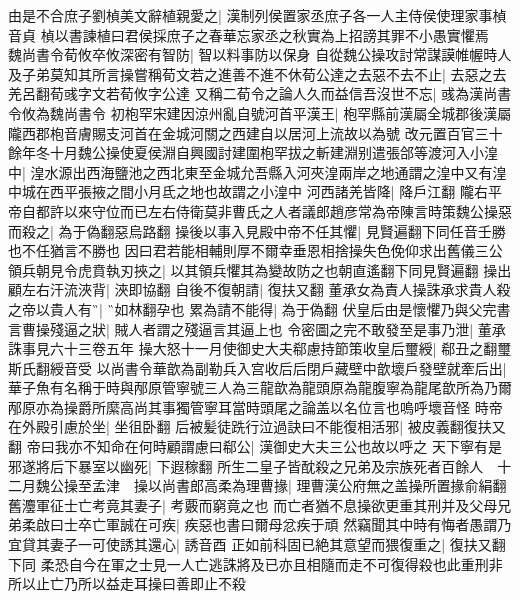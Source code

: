 由是不合庶子劉楨美文辭植親愛之|{
	漢制列侯置家丞庶子各一人主侍侯使理家事楨音貞}
楨以書諫植曰君侯採庶子之春華忘家丞之秋實為上招謗其罪不小愚實懼焉　魏尚書令荀攸卒攸深密有智防|{
	智以料事防以保身}
自從魏公操攻討常謀謨帷幄時人及子弟莫知其所言操嘗稱荀文若之進善不進不休荀公達之去惡不去不止|{
	去惡之去羌呂翻荀彧字文若荀攸字公達}
又稱二荀令之論人久而益信吾沒世不忘|{
	彧為漢尚書令攸為魏尚書令}
初枹罕宋建因涼州亂自號河首平漢王|{
	枹罕縣前漢屬全城郡後漢屬隴西郡枹音膚賜支河首在金城河關之西建自以居河上流故以為號}
改元置百官三十餘年冬十月魏公操使夏侯淵自興國討建圍枹罕拔之斬建淵别遣張郃等渡河入小湟中|{
	湟水源出西海鹽池之西北東至金城允吾縣入河夾湟兩岸之地通謂之湟中又有湟中城在西平張掖之間小月氐之地也故謂之小湟中}
河西諸羌皆降|{
	降戶江翻}
隴右平　帝自都許以來守位而已左右侍衛莫非曹氏之人者議郎趙彦常為帝陳言時策魏公操惡而殺之|{
	為于偽翻惡烏路翻}
操後以事入見殿中帝不任其懼|{
	見賢遍翻下同任音壬勝也不任猶言不勝也}
因曰君若能相輔則厚不爾幸垂恩相捨操失色俛仰求出舊儀三公領兵朝見令虎賁執刃挾之|{
	以其領兵懼其為變故防之也朝直遙翻下同見賢遍翻}
操出顧左右汗流浹背|{
	浹即協翻}
自後不復朝請|{
	復扶又翻}
董承女為責人操誅承求貴人殺之帝以貴人有|{
	如林翻孕也}
累為請不能得|{
	為于偽翻}
伏皇后由是懷懼乃與父完書言曹操殘逼之狀|{
	賊人者謂之殘逼言其逼上也}
令密圖之完不敢發至是事乃泄|{
	董承誅事見六十三卷五年}
操大怒十一月使御史大夫郗慮持節策收皇后璽綬|{
	郗丑之翻璽斯氏翻綬音受}
以尚書令華歆為副勒兵入宫收后后閉戶藏壁中歆壞戶發壁就牽后出|{
	華子魚有名稱于時與邴原管寧號三人為三龍歆為龍頭原為龍腹寧為龍尾歆所為乃爾邴原亦為操爵所縻高尚其事獨管寧耳當時頭尾之論盖以名位言也嗚呼壞音怪}
時帝在外殿引慮於坐|{
	坐徂卧翻}
后被髪徒跣行泣過訣曰不能復相活邪|{
	被皮義翻復扶又翻}
帝曰我亦不知命在何時顧謂慮曰郗公|{
	漢御史大夫三公也故以呼之}
天下寧有是邪遂將后下暴室以幽死|{
	下遐稼翻}
所生二皇子皆酖殺之兄弟及宗族死者百餘人　十二月魏公操至孟津　操以尚書郎高柔為理曹掾|{
	理曹漢公府無之盖操所置掾俞絹翻}
舊灋軍征士亡考竟其妻子|{
	考覈而窮竟之也}
而亡者猶不息操欲更重其刑并及父母兄弟柔啟曰士卒亡軍誠在可疾|{
	疾惡也書曰爾母忿疾于頑}
然竊聞其中時有悔者愚謂乃宜貸其妻子一可使誘其還心|{
	誘音酉}
正如前科固已絶其意望而猥復重之|{
	復扶又翻下同}
柔恐自今在軍之士見一人亡逃誅將及已亦且相隨而走不可復得殺也此重刑非所以止亡乃所以益走耳操曰善即止不殺

